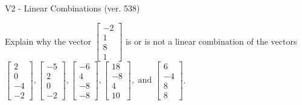 \begin{exercise}
  \begin{exerciseTitle}V2 - Linear Combinations (ver. 538)\end{exerciseTitle}
  \begin{exerciseStatement}
    Explain why the vector \(\left[\begin{array}{c}
-2 \\
1 \\
8 \\
1
\end{array}\right]\)  is or is not a linear 
	combination of the vectors \(\left[\begin{array}{c}
2 \\
0 \\
-4 \\
-2
\end{array}\right] , \left[\begin{array}{c}
-5 \\
2 \\
0 \\
-2
\end{array}\right] , \left[\begin{array}{c}
-6 \\
4 \\
-8 \\
-8
\end{array}\right] , \left[\begin{array}{c}
18 \\
-8 \\
4 \\
10
\end{array}\right] , \text{ and } \left[\begin{array}{c}
6 \\
-4 \\
8 \\
8
\end{array}\right]\).
	



\end{exerciseStatement}
\end{exercise}
